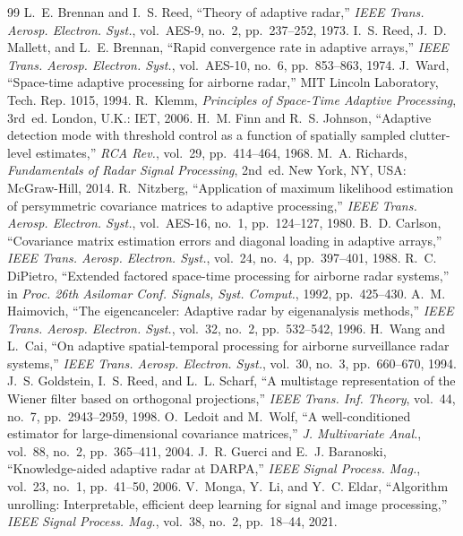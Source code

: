 \documentclass[conference]{IEEEtran}
\begin{document}
\begin{thebibliography}{99}
 L.~E. Brennan and I.~S. Reed, ``Theory of adaptive radar,'' \emph{IEEE Trans. Aerosp. Electron. Syst.}, vol.~AES-9, no.~2, pp.~237--252, 1973.
 I.~S. Reed, J.~D. Mallett, and L.~E. Brennan, ``Rapid convergence rate in adaptive arrays,'' \emph{IEEE Trans. Aerosp. Electron. Syst.}, vol.~AES-10, no.~6, pp.~853--863, 1974.
 J.~Ward, ``Space-time adaptive processing for airborne radar,'' MIT Lincoln Laboratory, Tech. Rep. 1015, 1994.
 R.~Klemm, \emph{Principles of Space-Time Adaptive Processing}, 3rd~ed. London, U.K.: IET, 2006.
 H.~M. Finn and R.~S. Johnson, ``Adaptive detection mode with threshold control as a function of spatially sampled clutter-level estimates,'' \emph{RCA Rev.}, vol.~29, pp.~414--464, 1968.
 M.~A. Richards, \emph{Fundamentals of Radar Signal Processing}, 2nd~ed. New York, NY, USA: McGraw-Hill, 2014.
 R.~Nitzberg, ``Application of maximum likelihood estimation of persymmetric covariance matrices to adaptive processing,'' \emph{IEEE Trans. Aerosp. Electron. Syst.}, vol.~AES-16, no.~1, pp.~124--127, 1980.
 B.~D. Carlson, ``Covariance matrix estimation errors and diagonal loading in adaptive arrays,'' \emph{IEEE Trans. Aerosp. Electron. Syst.}, vol.~24, no.~4, pp.~397--401, 1988.
 R.~C. DiPietro, ``Extended factored space-time processing for airborne radar systems,'' in \emph{Proc. 26th Asilomar Conf. Signals, Syst. Comput.}, 1992, pp.~425--430.
 A.~M. Haimovich, ``The eigencanceler: Adaptive radar by eigenanalysis methods,'' \emph{IEEE Trans. Aerosp. Electron. Syst.}, vol.~32, no.~2, pp.~532--542, 1996.
 H.~Wang and L.~Cai, ``On adaptive spatial-temporal processing for airborne surveillance radar systems,'' \emph{IEEE Trans. Aerosp. Electron. Syst.}, vol.~30, no.~3, pp.~660--670, 1994.
 J.~S. Goldstein, I.~S. Reed, and L.~L. Scharf, ``A multistage representation of the Wiener filter based on orthogonal projections,'' \emph{IEEE Trans. Inf. Theory}, vol.~44, no.~7, pp.~2943--2959, 1998.
 O.~Ledoit and M.~Wolf, ``A well-conditioned estimator for large-dimensional covariance matrices,'' \emph{J. Multivariate Anal.}, vol.~88, no.~2, pp.~365--411, 2004.
 J.~R. Guerci and E.~J. Baranoski, ``Knowledge-aided adaptive radar at DARPA,'' \emph{IEEE Signal Process. Mag.}, vol.~23, no.~1, pp.~41--50, 2006.
 V.~Monga, Y.~Li, and Y.~C. Eldar, ``Algorithm unrolling: Interpretable, efficient deep learning for signal and image processing,'' \emph{IEEE Signal Process. Mag.}, vol.~38, no.~2, pp.~18--44, 2021.
\end{thebibliography}
\end{document}
